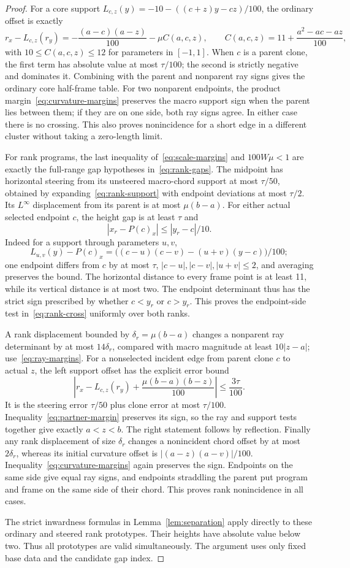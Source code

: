 \begin{proof}
For a core support $L_{c,z}(y)=-10-((c+z)y-cz)/100$, the ordinary offset is exactly
\[
r_x-L_{c,z}(r_y)
=-\frac{(a-c)(a-z)}{100}-\mu C(a,c,z),
\qquad C(a,c,z)=11+\frac{a^2-ac-az}{100},
\]
with $10\leq C(a,c,z)\leq12$ for parameters in $[-1,1]$.
When $c$ is a parent clone, the first term has absolute value at most $\tau/100$; the second is strictly negative and dominates it. Combining with the parent and nonparent ray signs gives the ordinary core half-frame table. For two nonparent endpoints, the product margin~\eqref{eq:curvature-margins} preserves the macro support sign when the parent lies between them; if they are on one side, both ray signs agree. In either case there is no crossing. This also proves nonincidence for a short edge in a different cluster without taking a zero-length limit.

For rank programs, the last inequality of~\eqref{eq:scale-margins} and $100W\mu<1$ are exactly the full-range gap hypotheses in~\eqref{eq:rank-gaps}. The midpoint has horizontal steering from its unsteered macro-chord support at most $\tau/50$, obtained by expanding~\eqref{eq:rank-support} with endpoint deviations at most $\tau/2$. Its $L^\infty$ displacement from its parent is at most $\mu(b-a)$. For either actual selected endpoint $c$, the height gap is at least $\tau$ and
\[
|x_r-P(c)_x|\leq |y_r-c|/10.
\]
Indeed for a support through parameters $u,v$,
\[
L_{u,v}(y)-P(c)_x
=\bigl((c-u)(c-v)-(u+v)(y-c)\bigr)/100;
\]
one endpoint differs from $c$ by at most $\tau$, $|c-u|,|c-v|,|u+v|\leq2$, and averaging preserves the bound. The horizontal distance to every frame point is at least 11, while its vertical distance is at most two. The endpoint determinant thus has the strict sign prescribed by whether $c<y_r$ or $c>y_r$. This proves the endpoint-side test in~\eqref{eq:rank-cross} uniformly over both ranks.

A rank displacement bounded by $\delta_r=\mu(b-a)$ changes a nonparent ray determinant by at most $14\delta_r$, compared with macro magnitude at least $10|z-a|$; use~\eqref{eq:ray-margins}. For a nonselected incident edge from parent clone $c$ to actual $z$, the left support offset has the explicit error bound
\[
\left|r_x-L_{c,z}(r_y)+\frac{\mu(b-a)(b-z)}{100}\right|
\leq\frac{3\tau}{100}.
\]
It is the steering error $\tau/50$ plus clone error at most $\tau/100$. Inequality~\eqref{eq:partner-margin} preserves its sign, so the ray and support tests together give exactly $a<z<b$. The right statement follows by reflection. Finally any rank displacement of size $\delta_r$ changes a nonincident chord offset by at most $2\delta_r$, whereas its initial curvature offset is $|(a-z)(a-v)|/100$. Inequality~\eqref{eq:curvature-margins} again preserves the sign. Endpoints on the same side give equal ray signs, and endpoints straddling the parent put program and frame on the same side of their chord. This proves rank nonincidence in all cases.

The strict inwardness formulas in Lemma~\ref{lem:separation} apply directly to these ordinary and steered rank prototypes. Their heights have absolute value below two. Thus all prototypes are valid simultaneously. The argument uses only fixed base data and the candidate gap index.
\end{proof}

